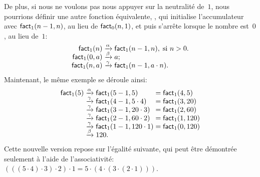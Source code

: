 De plus, si nous ne voulons pas nous appuyer sur la neutralité
de~\(1\), nous pourrions définir une autre fonction équivalente,
, qui initialise l'accumulateur avec
\(\textsf{fact}_1(n-1,n)\), au lieu de \(\textsf{fact}_0(n,1)\), et puis
s'arrête lorsque le nombre est~\(0\), au lieu de~\(1\):
\begin{equation*}
\begin{array}{r@{\;}c@{\;}l}
\fun{fact}_1(n) & \smashedrightarrow{\alpha} &
\fun{fact}_1(n-1,n),\;\text{si \(n > 0\)}.\\
\fun{fact}_1(0,a) & \smashedrightarrow{\beta} & a;\\
\fun{fact}_1(n,a) & \smashedrightarrow{\gamma} &
\fun{fact}_1(n-1,a \cdot n).
\end{array}
\end{equation*}
Maintenant, le même exemple se déroule ainsi:
\begin{equation*}
\begin{array}{r@{\;}c@{\;}l@{\;}c@{\;}l}
\fun{fact}_1(5)
& \xrightarrow{\smash[t]{\alpha}} & \fun{fact}_1(5-1,5)
& = & \fun{fact}_1(4,5)\\
& \xrightarrow{\smash[t]{\gamma}} & \fun{fact}_1(4-1,5 \cdot 4)
& = & \fun{fact}_1(3,20)\\
& \xrightarrow{\smash[t]{\gamma}} & \fun{fact}_1(3-1,20 \cdot 3)
& = & \fun{fact}_1(2,60)\\
& \xrightarrow{\smash[t]{\gamma}} & \fun{fact}_1(2-1,60 \cdot 2)
& = & \fun{fact}_1(1,120)\\
& \xrightarrow{\smash[t]{\gamma}} & \fun{fact}_1(1-1,120 \cdot 1)
& = & \fun{fact}_1(0,120)\\
& \xrightarrow{\smash[t]{\beta}} & 120.
\end{array}
\end{equation*}
Cette nouvelle version repose sur l'égalité suivante, qui peut être
démontrée seulement à l'aide de l'associativité: \((((5 \cdot 4) \cdot
3) \cdot 2) \cdot 1 = 5 \cdot (4 \cdot (3 \cdot (2 \cdot 1)))\).


